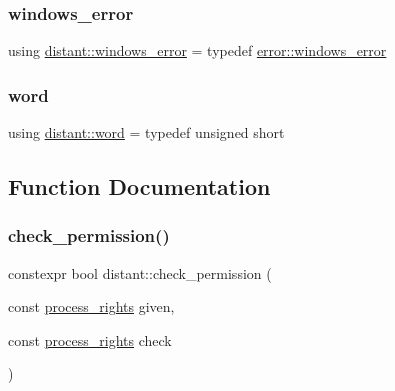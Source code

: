 \mbox{\label{namespacedistant_a72bfe7b4631ab280678b0b02ac38c8ab}} 
\subsubsection{\texorpdfstring{windows\+\_\+error}{windows\_error}}
{\footnotesize\ttfamily using \mbox{\hyperlink{namespacedistant_a72bfe7b4631ab280678b0b02ac38c8ab}{distant\+::windows\+\_\+error}} = typedef \mbox{\hyperlink{classdistant_1_1error_1_1windows__error}{error\+::windows\+\_\+error}}}

\mbox{\label{namespacedistant_a615d26c8218c108ba83dfea768c0e130}} 
\subsubsection{\texorpdfstring{word}{word}}
{\footnotesize\ttfamily using \mbox{\hyperlink{namespacedistant_a615d26c8218c108ba83dfea768c0e130}{distant\+::word}} = typedef unsigned short}



\subsection{Function Documentation}
\mbox{\label{namespacedistant_ad196fc4c5f60612f687d662f2c6b4362}} 
\subsubsection{\texorpdfstring{check\+\_\+permission()}{check\_permission()}\hspace{0.1cm}{\footnotesize\ttfamily [1/3]}}
{\footnotesize\ttfamily constexpr bool distant\+::check\+\_\+permission (\begin{DoxyParamCaption}\item[{const \mbox{\hyperlink{structdistant_1_1access__rights_ae153052a690584111c46ec7a78d1ef81}{process\+\_\+rights}}}]{given,  }\item[{const \mbox{\hyperlink{structdistant_1_1access__rights_ae153052a690584111c46ec7a78d1ef81}{process\+\_\+rights}}}]{check }\end{DoxyParamCaption})\hspace{0.3cm}{\ttfamily [noexcept]}}



